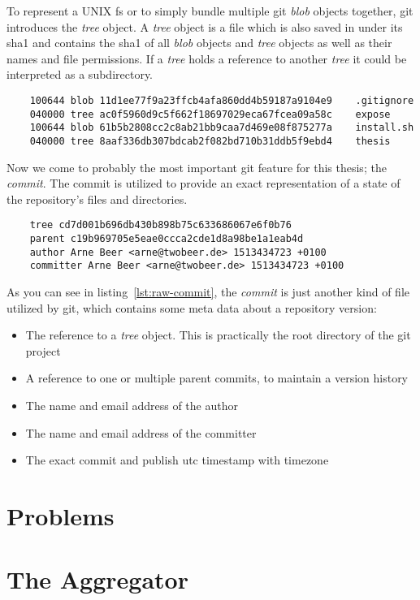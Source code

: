 To represent a UNIX \ac{fs} or to simply bundle multiple git \emph{blob} objects together, git introduces the \emph{tree} object.
A \emph{tree} object is a file which is also saved in  under its \ac{sha1} and contains the \ac{sha1} of all \emph{blob} objects and \emph{tree} objects as well as their names and file permissions.
If a \emph{tree} holds a reference to another \emph{tree} it could be interpreted as a subdirectory.

\begin{verbatim}
    100644 blob 11d1ee77f9a23ffcb4afa860dd4b59187a9104e9	.gitignore
    040000 tree ac0f5960d9c5f662f18697029eca67fcea09a58c	expose
    100644 blob 61b5b2808cc2c8ab21bb9caa7d469e08f875277a	install.sh
    040000 tree 8aaf336db307bdcab2f082bd710b31ddb5f9ebd4	thesis
\end{verbatim}
\begingroup
{}
\endgroup

Now we come to probably the most important git feature for this thesis; the \emph{commit}.
The commit is utilized to provide an exact representation of a state of the repository's files and directories.

\begin{verbatim}
    tree cd7d001b696db430b898b75c633686067e6f0b76
    parent c19b969705e5eae0ccca2cde1d8a98be1a1eab4d
    author Arne Beer <arne@twobeer.de> 1513434723 +0100
    committer Arne Beer <arne@twobeer.de> 1513434723 +0100
\end{verbatim}
\begingroup
{}
\endgroup

As you can see in listing~\ref{lst:raw-commit}, the \emph{commit} is just another kind of file utilized by git, which contains some meta data about a repository version:

\begin{itemize}
    \item The reference to a \emph{tree} object. This is practically the root directory of the git project
    \item A reference to one or multiple parent commits, to maintain a version history
    \item The name and email address of the author
    \item The name and email address of the committer
    \item The exact commit and publish \ac{utc} timestamp with timezone
\end{itemize}



\section{Problems}


\section{The Aggregator}


